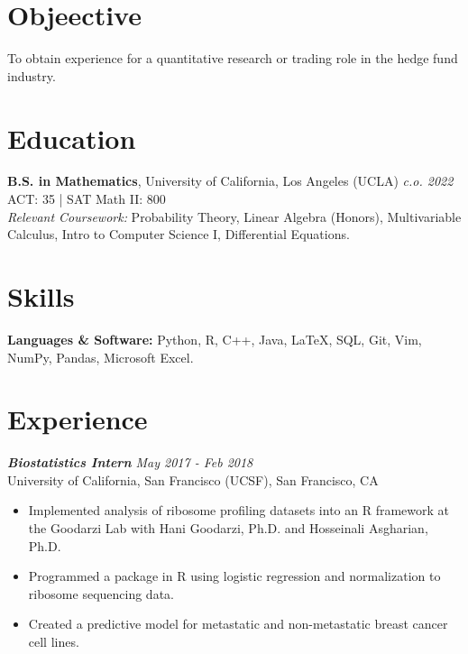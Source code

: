 \documentclass[margin, 10pt]{res} %
\begin{document}
\begin{resume}

\section{\large Objeective}

To obtain experience for a quantitative research or trading role in the hedge fund industry.

\section{\large Education}

{\bf B.S. in Mathematics}, University of California, Los Angeles (UCLA) \hfill{\sl c.o. 2022}\\
ACT: 35 | SAT Math II: 800\\
{\sl Relevant Coursework:} Probability Theory, Linear Algebra (Honors), Multivariable Calculus, Intro to Computer Science I, Differential Equations.

\section{\large Skills} 

{\bf Languages \& Software:} 
Python, R, C++, Java, {\LaTeX}, SQL, Git, Vim, NumPy, Pandas, Microsoft Excel.
 
\section{\large Experience}

{\sl {\bf Biostatistics Intern} \hfill May 2017 - Feb 2018} \\
University of California, San Francisco (UCSF), San Francisco, CA

\begin{itemize} \itemsep -1pt %
\item Implemented analysis of ribosome profiling datasets into an R framework at the Goodarzi Lab with Hani Goodarzi, Ph.D. and Hosseinali Asgharian, Ph.D.
\item Programmed a package in R using logistic regression and normalization to ribosome sequencing data.
\item Created a predictive model for metastatic and non-metastatic breast cancer cell lines.
\end{itemize}
 

\end{resume}
\end{document}

